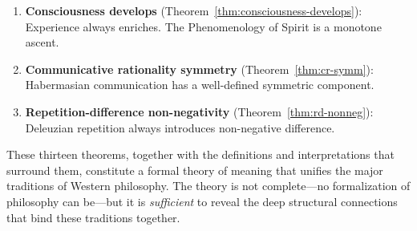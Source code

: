 \begin{remark}
\begin{enumerate}
\item \textbf{Consciousness develops} (Theorem~\ref{thm:consciousness-develops}):
Experience always enriches. The Phenomenology of Spirit is a monotone ascent.

\item \textbf{Communicative rationality symmetry} (Theorem~\ref{thm:cr-symm}):
Habermasian communication has a well-defined symmetric component.

\item \textbf{Repetition-difference non-negativity}
(Theorem~\ref{thm:rd-nonneg}):
Deleuzian repetition always introduces non-negative difference.
\end{enumerate}

These thirteen theorems, together with the definitions and interpretations
that surround them, constitute a formal theory of meaning that unifies
the major traditions of Western philosophy. The theory is not complete---no
formalization of philosophy can be---but it is \emph{sufficient} to reveal
the deep structural connections that bind these traditions together.
\end{remark}

